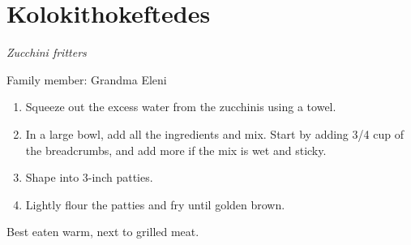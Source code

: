 \chapter{Kolokithokeftedes}
\label{ch:kolokithokeftedes}




\textit{Zucchini fritters}

Family member: Grandma Eleni

\begin{enumerate}
    \item Squeeze out the excess water from the zucchinis using a towel.
    \item In a large bowl, add all the ingredients and mix. Start by adding 3/4 cup of the breadcrumbs, and add more if the mix is wet and sticky.
    \item Shape into 3-inch patties.
    \item Lightly flour the patties and fry until golden brown.
\end{enumerate}

Best eaten warm, next to grilled meat.

